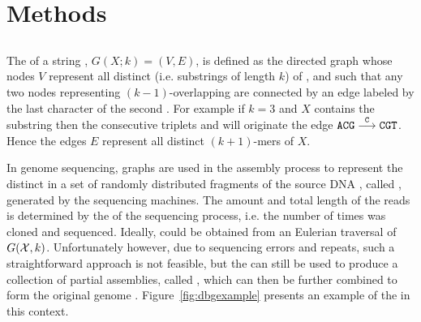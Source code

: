 \chapter{Methods}


\section{}
\label{sec:dBG}


The  of a string , $G(X;k)=(V,E)$, is defined as the directed graph whose nodes $V$ represent all distinct  (i.e. substrings of length $k$) of , and such that any two nodes representing $(k-1)$-overlapping  are connected by an edge labeled by the last character of the second \kmer. For example if $k=3$ and $X$ contains the substring  then the consecutive triplets  and  will originate the edge $\mathtt{ACG}\stackrel{\mathtt{C}}{\longrightarrow}\mathtt{CGT}$. Hence the edges $E$ represent all distinct $(k+1)$-mers of $X$. 

In genome sequencing, \dB graphs are used in the assembly process to represent the distinct  in a set \readset of randomly distributed fragments of the source DNA , called , generated by the sequencing machines. The amount and total length of the reads is determined by the  of the sequencing process, i.e. the number of times  was cloned and sequenced. Ideally,  could be obtained from an Eulerian traversal of $G(\readset, k)$. Unfortunately however, due to sequencing errors and repeats, such a straightforward approach is not feasible, but the \dBG can still be used to produce a collection of partial assemblies, called , which can then be further combined to form the original genome \cite{Pevzner2001}. Figure~\ref{fig:dbgexample} presents an example of the \dBG in this context.

